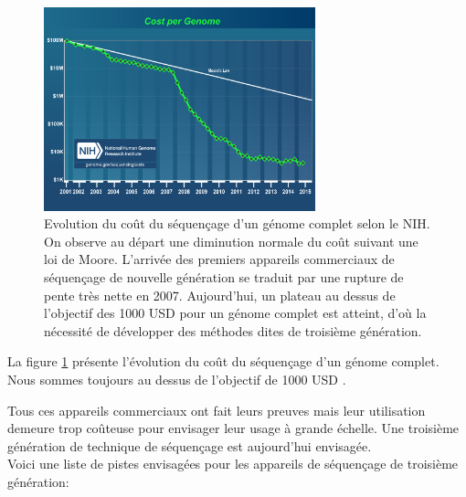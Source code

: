 \begin{figure}[H]
\begin{center}
\includegraphics[width=0.7\textwidth]{cost_genome.jpg}

\caption[Coût du séquençage]{Evolution du coût du séquençage d'un génome complet selon le NIH. On observe au départ une diminution normale du coût suivant une loi de Moore. L'arrivée des premiers appareils commerciaux de séquençage de nouvelle génération se traduit par une rupture de pente très nette en 2007. Aujourd'hui, un plateau au dessus de l'objectif des 1000 USD pour un génome complet est atteint, d'où la nécessité de développer des méthodes dites de troisième génération.}
\label{seqcost}
\end{center}
\end{figure}

La figure \ref{seqcost} présente l'évolution du coût du séquençage d'un génome complet. Nous sommes toujours au dessus de l'objectif de 1000 USD \cite{Mardis2006}.

Tous ces appareils commerciaux  ont fait leurs preuves mais leur utilisation demeure trop coûteuse pour envisager leur usage à grande échelle. Une troisième génération de technique de séquençage est aujourd'hui envisagée.\\

Voici une liste de pistes envisagées pour les appareils de séquençage de troisième génération:

